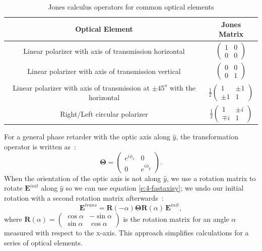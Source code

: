 \begin{table}
\caption{Jones calculus operators for common optical elements}
\begin{tabular}{|c|c|}
\hline
{\bf Optical Element} & {\bf Jones Matrix} \\ \hline \hline
Linear polarizer with axis of transmission horizontal & $\begin{pmatrix}1 & 0 \\ 0 & 0 \end{pmatrix}$ \\ \hline
Linear polarizer with axis of transmission vertical &$\begin{pmatrix}0 & 0 \\ 0 & 1 \end{pmatrix}$ \\ \hline
Linear polarizer with axis of transmission at $\pm 45^o$ with the horizontal &$\frac{1}{2} \begin{pmatrix}1 & \pm 1 \\ \pm 1 & 1\end{pmatrix}$ \\ \hline
Right/Left circular polarizer & $\frac{1}{2} \begin{pmatrix}
1 & \pm i \\ \mp i & 1
\end{pmatrix}$ \\
\hline
\end{tabular}\label{t:4-jmats}
\end{table}

For a general phase retarder with the optic axis along $\hat{y}$, the transformation operator is written as~\cite{RN232}:
\begin{equation}\label{e:4-fastaxisy}
\bm{\Theta} = \begin{pmatrix}e^{i \phi_x} & 0 \\ 0 & e^{i \phi_y} \end{pmatrix}.
\end{equation}
When the orientation of the optic axis is not along $\hat{y}$, we use a rotation matrix to rotate $\mathbf{E}^{init}$ along $\hat{y}$ so we can use equation \ref{e:4-fastaxisy}; we undo our initial rotation with a second rotation matrix afterwards~\cite{RN310}:
\begin{equation} \label{e:4-jones_decouple}
\mathbf{E}^{trans} = \mathbf{R}(-\alpha)\bm{\Theta} \mathbf{R}(\alpha)\,\mathbf{E}^{init},
\end{equation}
where $\mathbf{R}(\alpha) = \begin{pmatrix} \cos \alpha & -\sin \alpha \\ \sin \alpha & \cos \alpha \end{pmatrix}$
is the rotation matrix for an angle $\alpha$ measured with respect to the x-axis.
This approach simplifies calculations for a series of optical elements.

